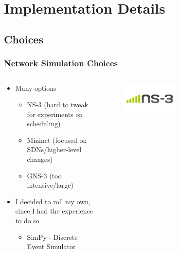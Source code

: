 \documentclass[compress]{beamer}
\begin{document}
    \section{Implementation Details}

    \subsection{Choices}
    \begin{frame}
        \frametitle{Network Simulation Choices}
        \begin{columns}
            \begin{column}{0.5\textwidth}
                \begin{itemize}
                    \item Many options
                    \begin{itemize}
                        \item NS-3 \alert{(hard to tweak for experiments on scheduling)}
                        \item Mininet \alert{(focused on SDNs/higher-level changes)}
                        \item GNS-3 \alert{(too intensive/large)}
                    \end{itemize}
                    \item I decided to roll my own, since I had the experience to do so
                    \begin{itemize}
                        \item SimPy - Discrete Event Simulator
                    \end{itemize}
                \end{itemize}
            \end{column}
            \begin{column}{0.5\textwidth}
                \begin{figure}
                    \centering
                    \includegraphics[width=0.5\textwidth]{../img/ns-3.png}
                \end{figure}
                \begin{figure}

\end{figure}
\end{column}
\end{columns}
\end{frame}
\end{document}
